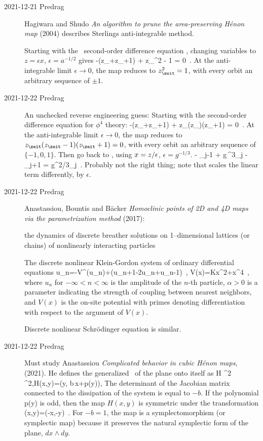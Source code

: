 \begin{description}
\item[2021-12-21 Predrag]
Hagiwara and Shudo
{\em An algorithm to prune the area-preserving {H{\'e}non} map}
(2004)
describes Sterlings anti-integrable method.

Starting with the \henlatt\ second-order difference equation
, changing
variables to $z = \epsilon x$, $\epsilon = a^{-1/2}$ gives
\beq
-\epsilon(z_{}+z_{\zeit+1}) + z_\zeit^2 - 1 = 0
\,.
At the anti-integrable limit $\epsilon\to0$, the map
reduces to $z_\zeit^2 = 1$,
with every orbit an arbitrary sequence of $\pm1$.

\item[2021-12-22 Predrag] An unchecked reverse engineering guess:
Starting with the second-order difference equation for
$\phi^4$ theory:
\beq
-\epsilon(z_{}+z_{\zeit+1}) + z_\zeit(z_)(z_\zeit+1) = 0
\,.
At the anti-integrable limit $\epsilon\to0$, the map
reduces to $z_\zeit(z_\zeit-1)(z_\zeit+1)= 0$,
with every orbit an arbitrary sequence of $\{-1,0,1\}$.
Then go back to , using
$x= z/\epsilon$, $\epsilon = g^{-1/3}$.
\beq
- \ssp_{j-1} + g\,\ssp^3_j - \ssp_{j+1} =  g^{2/3}\ssp_j
\,.
Probably not the right thing; note that
 scales the linear term differently,
 by $\epsilon$.

\item[2021-12-22 Predrag]
Anastassiou, Bountis and B{\"a}cker {\em Homoclinic points of
{2D} and {4D} maps via the parametrization method} (2017):

the dynamics of discrete breather solutions on
1--dimensional
lattices (or chains) of nonlinearly interacting particles

The discrete nonlinear Klein-Gordon
system of ordinary differential equations
\beq
\ddot u_n=-V^\prime\left(u_n\right)+\alpha\left(u_{n+1}-2u_n+u_{n-1}\right)
\,, \quad
V(x)=Kx^2+x^4
\,,
where $u_n$ for $-\infty<n<\infty$ is the amplitude of the $n$-th
particle, $\alpha>0$ is a parameter indicating the strength of coupling
between nearest neighbors, and $V(x)$ is the on-site potential with
primes denoting differentiation with respect to the argument of $V(x)$.

Discrete nonlinear Schr{\"o}dinger equation is similar.


\item[2021-12-22 Predrag]
Must study Anastassiou
{\em Complicated behavior in cubic {H{\'{e}}non} maps},
(2021).
He defines the generalized \HenonMap\ of the plane onto itself as
\beq
H\colon {} ^2\to {} ^2,\qquad H(x,y)=(y, b\,x+p(y)),
The determinant of the Jacobian matrix connected to the dissipation of
the system is equal to $-b$. If the polynomial p(y) is odd, then the
map $H(x,y)$ is symmetric under the transformation
\beq
\sigma(x,y)=(-x,-y)
\,.
For $-b=1$, the map is a symplectomorphism (or symplectic map)
because it preserves the natural symplectic form of the plane,
$dx\wedge{dy}$.


\end{description}

